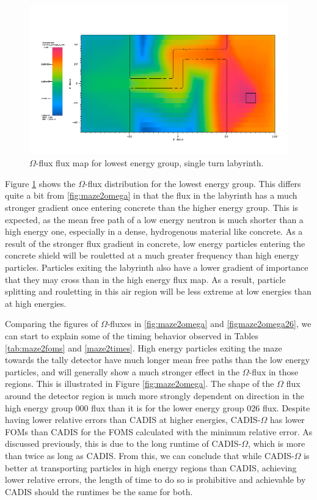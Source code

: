 \begin{figure}[h!]
  \centering
    \includegraphics[width=0.9\linewidth]{./chapters/characterization_probs/figures/char/maze2/maze2MomegaG26.png}
    \caption{$\Omega$-flux flux map for lowest energy group, single turn
    labyrinth.}
    \label{fig:maze2omega26}
\end{figure}

Figure \ref{fig:maze2omega26} shows the $\Omega$-flux distribution for the
lowest energy group. This differs quite a bit from \ref{fig:maze2omega} in that
the flux in the labyrinth has a much stronger gradient once entering concrete
than the higher energy group. This is expected, as the mean free path of a low
energy neutron is much shorter than a high energy one, especially in a dense,
hydrogenous material like concrete. As a result of the stronger flux gradient in
concrete, low energy particles entering
the concrete shield will be rouletted at a much greater frequency than high
energy particles. Particles exiting the labyrinth also have a lower gradient of
importance that they may cross than in the high energy flux map. As a result,
particle splitting and rouletting in this air region will be less extreme at low
energies than at high energies.

Comparing the figures of $\Omega$-fluxes in \ref{fig:maze2omega} and
\ref{figmaze2omega26}, we can start to explain some of the timing behavior
observed in Tables \ref{tab:maze2foms} and \ref{maze2times}.
High energy particles exiting the maze towards the tally
detector have much longer mean free paths than the low energy particles, and
will generally show a much stronger effect in the $\Omega$-flux in those
regions. This is illustrated in Figure \ref{fig:maze2omega}.
The shape of the $\Omega$
flux around the detector region is much more strongly dependent on direction in
the high energy group 000 flux than it is for the lower energy group 026 flux.
Despite having lower relative errors than CADIS at higher energies,
CADIS-$\Omega$ has lower FOMs than CADIS for the FOMS calculated with the
minimum relative error. As discussed previously, this is due to the long runtime
of CADIS-$\Omega$, which is more than twice as long as CADIS. From this, we can
conclude that while CADIS-$\Omega$ is better at transporting particles in high
energy regions than CADIS, achieving lower relative errors, the length of time
to do so is prohibitive and achievable by CADIS should the runtimes be the same
for both.

